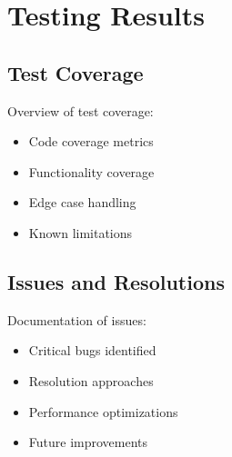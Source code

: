 \section{Testing Results}
\subsection{Test Coverage}
Overview of test coverage:
\begin{itemize}
    \item Code coverage metrics
    \item Functionality coverage
    \item Edge case handling
    \item Known limitations
\end{itemize}

\subsection{Issues and Resolutions}
Documentation of issues:
\begin{itemize}
    \item Critical bugs identified
    \item Resolution approaches
    \item Performance optimizations
    \item Future improvements
\end{itemize}
